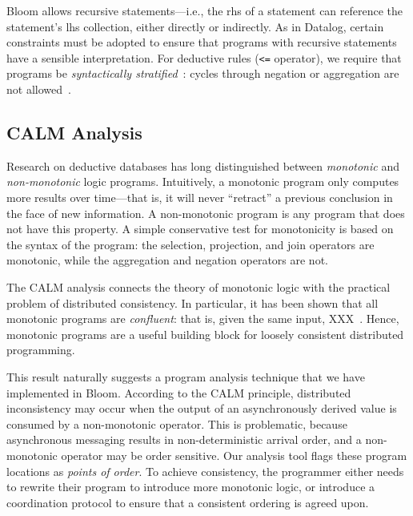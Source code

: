 Bloom allows recursive statements---i.e., the rhs of a statement can reference
the statement's lhs collection, either directly or indirectly. As in Datalog,
certain constraints must be adopted to ensure that programs with recursive
statements have a sensible interpretation. For deductive rules (\verb+<=+
operator), we require that programs be \emph{syntactically
  stratified}~\cite{Apt1988}: cycles through negation or aggregation are not
allowed~\cite{dedalus}.

\subsection{CALM Analysis}
\label{sec:bg-calm}

Research on deductive databases has long distinguished between \emph{monotonic}
and \emph{non-monotonic} logic programs. Intuitively, a monotonic program only
computes more results over time---that is, it will never ``retract'' a previous
conclusion in the face of new information. A non-monotonic program is any
program that does not have this property. A simple conservative test for
monotonicity is based on the syntax of the program: the selection, projection,
and join operators are monotonic, while the aggregation and negation operators
are not.

The CALM analysis connects the theory of monotonic logic with the practical
problem of distributed consistency. In particular, it has been shown that all
monotonic programs are \emph{confluent}: that is, given the same input,
XXX~\cite{Ameloot2011}. Hence, monotonic programs are a useful building block
for loosely consistent distributed programming.

This result naturally suggests a program analysis technique that we have
implemented in Bloom. According to the CALM principle, distributed inconsistency
may occur when the output of an asynchronously derived value is consumed by a
non-monotonic operator. This is problematic, because asynchronous messaging
results in non-deterministic arrival order, and a non-monotonic operator may be
order sensitive. Our analysis tool flags these program locations as \emph{points
  of order}. To achieve consistency, the programmer either needs to rewrite
their program to introduce more monotonic logic, or introduce a coordination
protocol to ensure that a consistent ordering is agreed upon.

